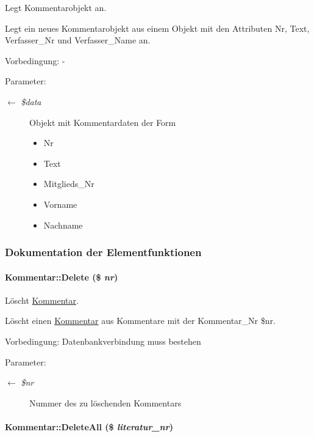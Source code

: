 Legt Kommentarobjekt an. 

Legt ein neues Kommentarobjekt aus einem Objekt mit den Attributen Nr, Text, Verfasser\_\-Nr und Verfasser\_\-Name an. \begin{Desc}
\item[Vorbedingung:]- \end{Desc}
\begin{Desc}
\item[Parameter:]
\begin{description}
\item[\mbox{$\leftarrow$} {\em \$data}]Objekt mit Kommentardaten der Form\begin{itemize}
\item Nr\item Text\item Mitglieds\_\-Nr\item Vorname\item Nachname \end{itemize}
\end{description}
\end{Desc}


\subsubsection{Dokumentation der Elementfunktionen}
\hypertarget{classKommentar_31c1fdfb4fb8f24e0016c8ddb98ddcdc}{
\paragraph[Delete]{\setlength{\rightskip}{0pt plus 5cm}Kommentar::Delete (\$ {\em nr})}\hfill}
\label{classKommentar_31c1fdfb4fb8f24e0016c8ddb98ddcdc}


Löscht \hyperlink{classKommentar}{Kommentar}. 

Löscht einen \hyperlink{classKommentar}{Kommentar} aus Kommentare mit der Kommentar\_\-Nr \$nr. \begin{Desc}
\item[Vorbedingung:]Datenbankverbindung muss bestehen \end{Desc}
\begin{Desc}
\item[Parameter:]
\begin{description}
\item[\mbox{$\leftarrow$} {\em \$nr}]Nummer des zu löschenden Kommentars \end{description}
\end{Desc}
\hypertarget{classKommentar_9903f1df98f71eefa3b44a81d6a8ee5c}{
\paragraph[DeleteAll]{\setlength{\rightskip}{0pt plus 5cm}Kommentar::Delete\-All (\$ {\em literatur\_\-nr})}\hfill}
\label{classKommentar_9903f1df98f71eefa3b44a81d6a8ee5c}


